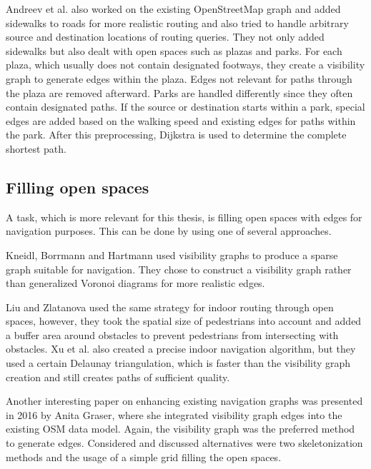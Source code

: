 		Andreev et al. also worked on the existing OpenStreetMap graph and added sidewalks to roads for more realistic routing and also tried to handle arbitrary source and destination locations of routing queries\cite{andreev-osm-generate-sidewalks}.
		They not only added sidewalks but also dealt with open spaces such as plazas and parks.
		For each plaza, which usually does not contain designated footways, they create a visibility graph to generate edges within the plaza.
		Edges not relevant for paths through the plaza are removed afterward.
		Parks are handled differently since they often contain designated paths.
		If the source or destination starts within a park, special edges are added based on the walking speed and existing edges for paths within the park.
		After this preprocessing, Dijkstra is used to determine the complete shortest path.
	
	\subsection{Filling open spaces}
	\label{subsec:filling-open-spaces}
	
		A task, which is more relevant for this thesis, is filling open spaces with edges for navigation purposes.
		This can be done by using one of several approaches.
	
		Kneidl, Borrmann and Hartmann used visibility graphs to produce a sparse graph suitable for navigation\cite{kneidl-borrmann-hartmann-navigation}.
		They chose to construct a visibility graph rather than generalized Voronoi diagrams for more realistic edges.
		
		Liu and Zlatanova used the same strategy for indoor routing through open spaces\cite{liu-indoor-routing}, however, they took the spatial size of pedestrians into account and added a buffer area around obstacles to prevent pedestrians from intersecting with obstacles.
		Xu et al. also created a precise indoor navigation algorithm, but they used a certain Delaunay triangulation, which is faster than the visibility graph creation and still creates paths of sufficient quality\cite{xu-indoor-delaunay}.
		
		Another interesting paper on enhancing existing navigation graphs was presented in 2016 by Anita Graser, where she integrated visibility graph edges into the existing OSM data model\cite{graser-osm-open-spaces}.
		Again, the visibility graph was the preferred method to generate edges.
		Considered and discussed alternatives were two skeletonization methods and the usage of a simple grid filling the open spaces.
		

